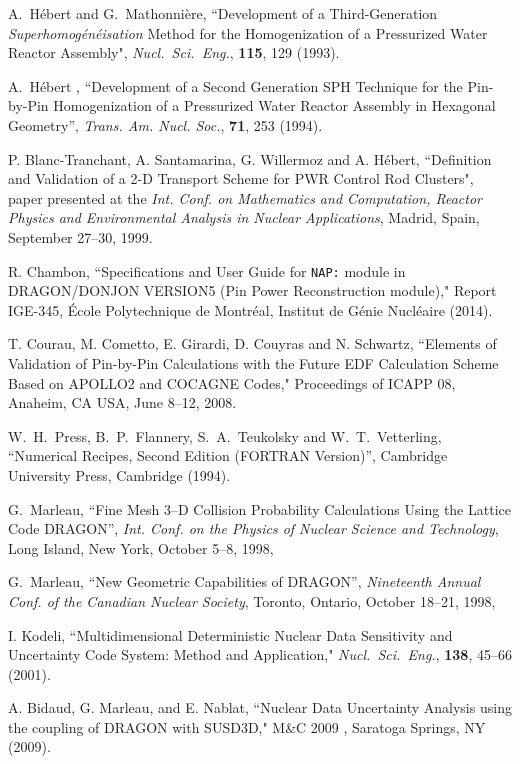 \begin{thebibliography}{99}
A.~H\'ebert and G.~Mathonni\`ere, ``Development of a Third-Generation {\sl
Superhomog\'en\'eisation} Method for the Homogenization of a Pressurized Water
Reactor Assembly", {\sl Nucl.~Sci.~Eng.}, {\bf 115}, 129 (1993).

A.~H\'ebert , ``Development of a Second Generation SPH Technique for the
Pin-by-Pin Homogenization of a Pressurized Water Reactor Assembly in Hexagonal
Geometry'', {\sl Trans. Am. Nucl. Soc.}, {\bf 71}, 253 (1994).

P. Blanc-Tranchant, A. Santamarina, G. Willermoz and A. H\'ebert, ``Definition and Validation of a 2-D Transport
Scheme for PWR Control Rod Clusters", paper presented at the {\sl Int. Conf. on Mathematics and Computation,
Reactor Physics and Environmental Analysis in Nuclear Applications}, Madrid, Spain, September 27--30, 1999.

R. Chambon, ``Specifications and User Guide for {\tt NAP:} module in DRAGON/DONJON VERSION5
(Pin Power Reconstruction module)," Report IGE-345,
\'Ecole Polytechnique de Montr\'eal,
 Institut de G\'enie Nucl\'eaire (2014).

T. Courau, M. Cometto, E. Girardi, D. Couyras and N. Schwartz, ``Elements of Validation of Pin-by-Pin Calculations with the Future EDF Calculation Scheme Based on APOLLO2 and COCAGNE Codes," Proceedings of ICAPP 08, Anaheim, CA USA, June 8--12, 2008.

W.~H.~Press, B.~P.~Flannery, S.~A.~Teukolsky and W.~T.~Vetterling, ``Numerical
Recipes, Second Edition (FORTRAN Version)'', Cambridge University Press,
Cambridge (1994).

G.~Marleau, 
``Fine Mesh 3--D Collision Probability Calculations Using the Lattice Code DRAGON'',
\textsl{Int. Conf. on the Physics of Nuclear Science and Technology}, 
Long Island, New York, October 5--8, 1998,

G.~Marleau, ``New Geometric Capabilities of DRAGON'',
\textsl{Nineteenth Annual Conf. of the Canadian Nuclear Society}, 
Toronto, Ontario, October 18--21, 1998,

I. Kodeli, ``Multidimensional Deterministic Nuclear Data Sensitivity and Uncertainty Code System: Method and Application,"
{\sl Nucl.~Sci.~Eng.}, {\bf 138}, 45--66 (2001).

A. Bidaud, G. Marleau, and E. Nablat, ``Nuclear Data Uncertainty Analysis using the coupling of DRAGON with SUSD3D," M\&C 2009 , Saratoga Springs, NY (2009).


\end{thebibliography}
